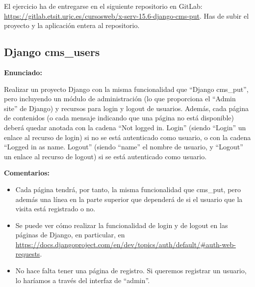 El ejercicio ha de entregarse en el siguiente repositorio en GitLab: 
\url{https://gitlab.etsit.urjc.es/cursosweb/x-serv-15.6-django-cms-put}. Has de subir el proyecto y la aplicación entera al repositorio.

%

\subsection{Django cms\_users}
\label{subsec:django-users}

\textbf{Enunciado:}

Realizar un proyecto Django con la misma funcionalidad que ``Django cms\_put'', pero incluyendo un módulo de administración (lo que proporciona el ``Admin site'' de Django) y recursos para login y logout de usuarios. Además, cada página de contenidos (o cada mensaje indicando que una página no está disponible) deberá quedar anotada con la cadena ``Not logged in. Login'' (siendo ``Login'' un enlace al recurso de login) si no se está autenticado como usuario, o con la cadena ``Logged in as name. Logout'' (siendo ``name'' el nombre de usuario, y ``Logout'' un enlace al recurso de logout) si se está autenticado como usuario.

\textbf{Comentarios:}

\begin{itemize}
  \item Cada página tendrá, por tanto, la misma funcionalidad que cms\_put, pero además una línea en la parte superior que dependerá de si el usuario que la visita está registrado o no.

  \item Se puede ver cómo realizar la funcionalidad de login y de logout en las páginas de Django, en particular, en \url{https://docs.djangoproject.com/en/dev/topics/auth/default/#auth-web-requests}.

  \item No hace falta tener una página de registro. Si queremos registrar un usuario, lo haríamos a través del interfaz de ``admin''.
\end{itemize}


